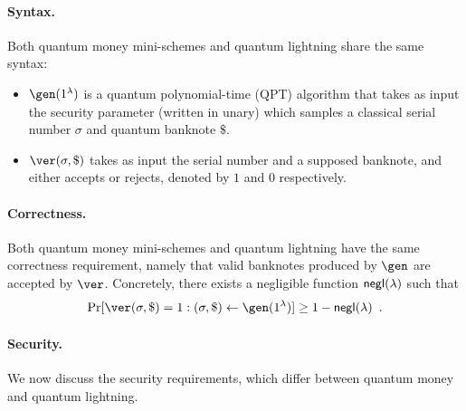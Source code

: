 \documentclass{article}\usepackage[a4paper,margin=20mm]{geometry}
\numberwithin{theorem}{section}
\numberwithin{equation}{section}
\newcommand{\negl}{{\sf negl}}
\begin{document}
\paragraph{Syntax.} Both quantum money mini-schemes and quantum lightning share the same syntax:
\begin{itemize}
	\item $\gen(1^\lambda)$ is a quantum polynomial-time (QPT) algorithm that takes as input the security parameter (written in unary) which samples a classical serial number $\sigma$ and quantum banknote $\$$. 
	\item $\ver(\sigma,\$)$ takes as input the serial number and a supposed banknote, and either accepts or rejects, denoted by $1$ and $0$ respectively.
\end{itemize}

\paragraph{Correctness.} Both quantum money mini-schemes and quantum lightning have the same correctness requirement, namely that valid banknotes produced by $\gen$ are accepted by $\ver$. Concretely, there exists a negligible function $\negl(\lambda)$ such that
\[\Pr[\ver(\sigma,\$)=1:(\sigma,\$)\gets\gen(1^\lambda)]\geq 1-\negl(\lambda)\enspace.\]

\paragraph{Security.} We now discuss the security requirements, which differ between quantum money and quantum lightning.
\end{document}

